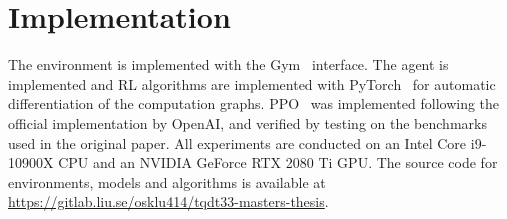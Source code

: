 \section{Implementation}

The environment is implemented with the Gym~\cite{brockman_openai_2016} interface.
The agent is implemented and RL algorithms are implemented with PyTorch~\cite{paszke_pytorch_2019} for automatic differentiation of the computation graphs.
PPO~\cite{schulman_proximal_2017} was implemented following the official implementation by OpenAI,
and verified by testing on the benchmarks used in the original paper.
All experiments are conducted on an Intel Core i9-10900X CPU and an NVIDIA GeForce RTX 2080 Ti GPU.
The source code for environments, models and algorithms is available at \url{https://gitlab.liu.se/osklu414/tqdt33-masters-thesis}.
